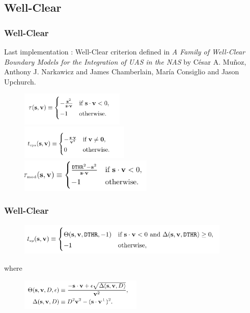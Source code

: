 \documentclass{beamer}
\begin{document}
\subsection{Well-Clear}
\begin{frame}
	\tableofcontents[currentsubsection,sectionstyle=show/shaded,subsectionstyle=show/shaded/hide]
\end{frame}


\begin{frame}[fragile]
	\frametitle{Well-Clear}
	
	Last implementation : Well-Clear criterion defined in \textit{A Family of Well-Clear Boundary Models for the Integration of UAS in the NAS} by C\'esar A. Mu\~{n}oz, Anthony J. Narkawicz and James Chamberlain, Mar\'ia Consiglio and Jason Upchurch.
	
	\begin{figure}
		\includegraphics[height=16mm]{images/WCV/tau.pdf}\\
		\includegraphics[height=16mm]{images/WCV/tcpa.pdf}\\
		\includegraphics[height=16mm]{images/WCV/taumod.pdf}\\
	\end{figure}
	

\end{frame}

\begin{frame}[fragile]
	\frametitle{Well-Clear}

	
	\begin{figure}
		\includegraphics[height=15mm]{images/WCV/tep.pdf}\\
	\end{figure}
		where
	\begin{figure}
		\includegraphics[height=15mm]{images/WCV/theta.pdf}\\
	\end{figure}
	
\end{frame}
\end{document}
